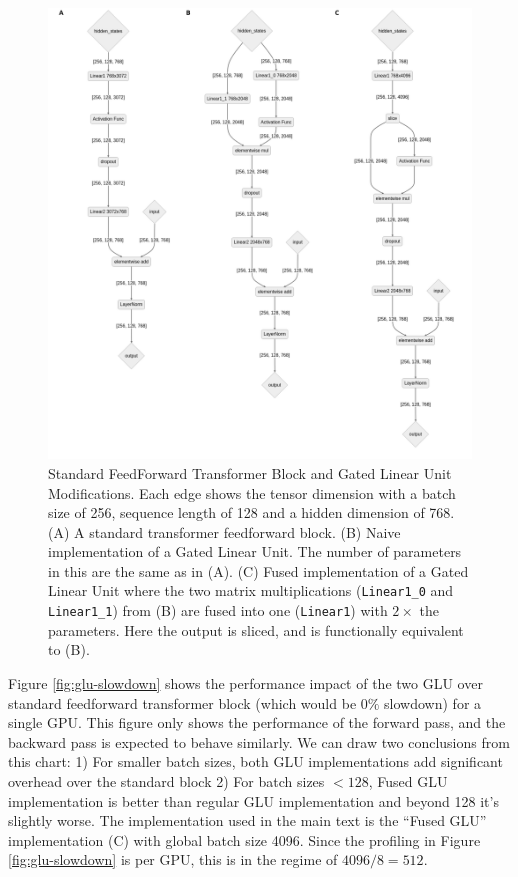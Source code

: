 \begin{figure}
    \centering
    \includegraphics[width=1\textwidth]{figures/glu-diagrams.png}
    \caption{Standard FeedForward Transformer Block and Gated Linear Unit Modifications. Each edge shows the tensor dimension with a batch size of 256, sequence length of 128 and a hidden dimension of 768. (A) A standard transformer feedforward block. (B) Naive implementation of a Gated Linear Unit. The number of parameters in this are the same as in (A). (C) Fused implementation of a Gated Linear Unit where the two matrix multiplications (\texttt{Linear1\_0} and \texttt{Linear1\_1}) from (B) are fused into one (\texttt{Linear1}) with $2\times$ the parameters. Here the output is sliced, and is functionally equivalent to (B).}
    \label{fig:glu-diagrams}
\end{figure}

Figure \ref{fig:glu-slowdown} shows the performance impact of the two GLU over standard feedforward transformer block (which would be $0\%$ slowdown) for a single GPU. This figure only shows the performance of the forward pass, and the backward pass is expected to behave similarly. We can draw two conclusions from this chart: 1) For smaller batch sizes, both GLU implementations add significant overhead over the standard block 2) For batch sizes $<128$, Fused GLU implementation is better than regular GLU implementation and beyond 128 it's slightly worse. The implementation used in the main text is the ``Fused GLU'' implementation (C) with global batch size 4096. Since the profiling in Figure \ref{fig:glu-slowdown} is per GPU, this is in the regime of $4096/8=512$.

